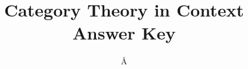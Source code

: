 \documentclass{report}
\begin{document}
\title{Category Theory in Context\\
Answer Key}
\author{
	\KP\and
	\AA\and
	\JC\and
	\BJ\and
	\MK\and
	\ML\and
	\AM\and
	\EM\and
	\TW
}

\maketitle
\tableofcontents

% 
% 
% 
\end{document}
